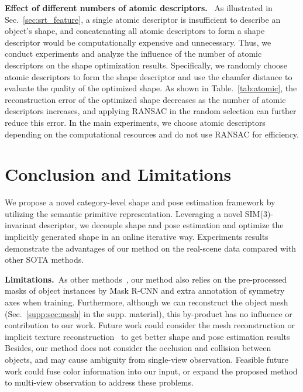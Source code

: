 \documentclass{article}
\newcommand{\revise}[1]{\textcolor{revise}{#1}}
\begin{document}
\textbf{Effect of different numbers of atomic descriptors.}~
\revise{
As illustrated in Sec.~\ref{sec:srt_feature}, a single atomic descriptor is insufficient to describe an object's shape, and concatenating all atomic descriptors to form a shape descriptor would be computationally expensive and unnecessary. Thus, we conduct experiments and analyze the influence of the number of atomic descriptors on the shape optimization results. Specifically, we randomly choose  atomic descriptors to form the shape descriptor and use the chamfer distance to evaluate the quality of the optimized shape.
As shown in Table.~\ref{tab:atomic}, the reconstruction error of the optimized shape decreases as the number of atomic descriptors increases, and applying RANSAC in the random selection can further reduce this error. In the main experiments, we choose  atomic descriptors depending on the computational resources and do not use RANSAC for efficiency.}
 \section{Conclusion and Limitations}
We propose a novel category-level shape and pose estimation framework by utilizing the semantic primitive representation. Leveraging a novel SIM(3)-invariant descriptor, we decouple shape and pose estimation and optimize the implicitly generated shape in an online iterative way. Experiments results demonstrate the advantages
of our method on the real-scene data compared with other SOTA methods. 

\textbf{Limitations.}~As other methods~\cite{SPD,SGPA,lin2022sar}, our method also relies on the pre-processed masks of object instances by Mask R-CNN and \revise{extra annotation of symmetry axes when training. Furthermore, although we can reconstruct the object mesh (Sec.~\ref{supp:sec:mesh} in the supp. material), this by-product has no influence or contribution to our work. Future work could consider the mesh reconstruction or implicit texture reconstruction~\cite{irshad2022shapo} to get better shape and pose estimation results} Besides, our method does not consider the occlusion and collision between objects, and may cause ambiguity from single-view observation. Feasible future work could fuse color information into our input, or expand the proposed method to multi-view observation to address these problems. 





\clearpage
{}
\end{document}
